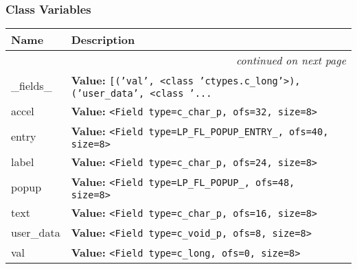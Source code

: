 
  \subsubsection{Class Variables}

    \vspace{-1cm}
\hspace{\varindent}\begin{longtable}{|p{\varnamewidth}|p{\vardescrwidth}|l}
\cline{1-2}
\cline{1-2} \centering \textbf{Name} & \centering \textbf{Description}& \\
\cline{1-2}
\endhead\cline{1-2}\multicolumn{3}{r}{\small\textit{continued on next page}}\\\endfoot\cline{1-2}
\endlastfoot\raggedright \_\-f\-i\-e\-l\-d\-s\-\_\- & \raggedright \textbf{Value:} 
{\tt \texttt{[}\texttt{(}\texttt{'}\texttt{val}\texttt{'}\texttt{, }{\textless}class 'ctypes.c\_long'{\textgreater}\texttt{)}\texttt{, }\texttt{(}\texttt{'}\texttt{user\_data}\texttt{'}\texttt{, }{\textless}class '\texttt{...}}&\\
\cline{1-2}
\raggedright a\-c\-c\-e\-l\- & \raggedright \textbf{Value:} 
{\tt {\textless}Field type=c\_char\_p, ofs=32, size=8{\textgreater}}&\\
\cline{1-2}
\raggedright e\-n\-t\-r\-y\- & \raggedright \textbf{Value:} 
{\tt {\textless}Field type=LP\_FL\_POPUP\_ENTRY\_, ofs=40, size=8{\textgreater}}&\\
\cline{1-2}
\raggedright l\-a\-b\-e\-l\- & \raggedright \textbf{Value:} 
{\tt {\textless}Field type=c\_char\_p, ofs=24, size=8{\textgreater}}&\\
\cline{1-2}
\raggedright p\-o\-p\-u\-p\- & \raggedright \textbf{Value:} 
{\tt {\textless}Field type=LP\_FL\_POPUP\_, ofs=48, size=8{\textgreater}}&\\
\cline{1-2}
\raggedright t\-e\-x\-t\- & \raggedright \textbf{Value:} 
{\tt {\textless}Field type=c\_char\_p, ofs=16, size=8{\textgreater}}&\\
\cline{1-2}
\raggedright u\-s\-e\-r\-\_\-d\-a\-t\-a\- & \raggedright \textbf{Value:} 
{\tt {\textless}Field type=c\_void\_p, ofs=8, size=8{\textgreater}}&\\
\cline{1-2}
\raggedright v\-a\-l\- & \raggedright \textbf{Value:} 
{\tt {\textless}Field type=c\_long, ofs=0, size=8{\textgreater}}&\\
\cline{1-2}
\end{longtable}

